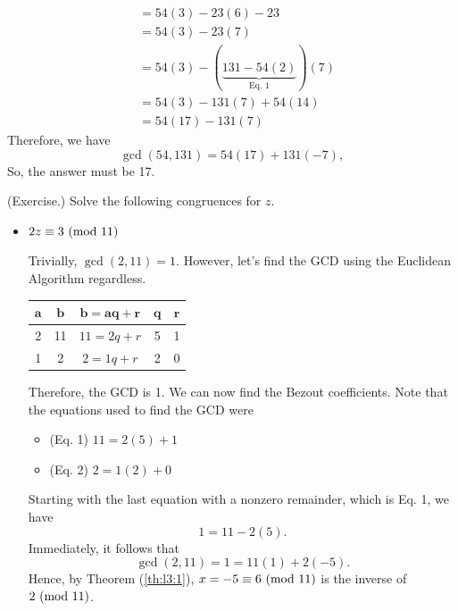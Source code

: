 \documentclass[letterpaper]{article}
\newcommand{\0}{\mathbf{0}}
\begin{document}
\begin{mdframed}
\begin{mdframed}
\begin{equation*}
\begin{aligned}
                    &= 54(3) - 23(6) - 23 \\ 
                    &= 54(3) - 23(7) \\ 
                    &= 54(3) - (\underbrace{131 - 54(2)}_{\text{Eq. 1}})(7) \\ 
                    &= 54(3) - 131(7) + 54(14) \\ 
                    &= 54(17) - 131(7)
            \end{aligned}
        \end{equation*}
        Therefore, we have 
        \[\gcd(54, 131) = 54(17) + 131(-7),\]
        So, the answer must be 17. 
    \end{mdframed}
\end{mdframed}

\begin{mdframed}
    (Exercise.) Solve the following congruences for $z$. 
    \begin{itemize}
        \item $2z \equiv 3 \ (\mathrm{mod}\ 11)$
        \begin{mdframed}
            Trivially, $\gcd(2, 11) = 1$. However, let's find the GCD using the Euclidean Algorithm regardless.
            \begin{center}
                \begin{tabular}{|c|c|c|c|c|}
                    \hline 
                    $\mathbf{a}$ & $\mathbf{b}$ & $\mathbf{b = aq + r}$ & $\mathbf{q}$ & $\mathbf{r}$ \\ 
                    \hline 
                    2 & 11 & $11 = 2q + r$ & 5 & 1 \\ 
                    1 & 2 & $2 = 1q + r$ & 2 & 0 \\ 
                    \hline 
                \end{tabular}
            \end{center}
            Therefore, the GCD is 1. We can now find the Bezout coefficients. Note that the equations used to find the GCD were 
            \begin{itemize}
                \item (Eq. 1) $11 = 2(5) + 1$
                \item (Eq. 2) $2 = 1(2) + 0$
            \end{itemize} 
            Starting with the last equation with a nonzero remainder, which is Eq. 1, we have 
            \[1 = 11 - 2(5).\]
            Immediately, it follows that 
            \[\gcd(2, 11) = 1 = 11(1) + 2(-5).\]
            Hence, by Theorem (\ref{th:l3:1}), $x = -5 \equiv 6 \ (\mathrm{mod}\ 11)$ is the inverse of $2 \ (\mathrm{mod}\ 11)$.


\end{mdframed}
\end{itemize}
\end{mdframed}
\end{document}
